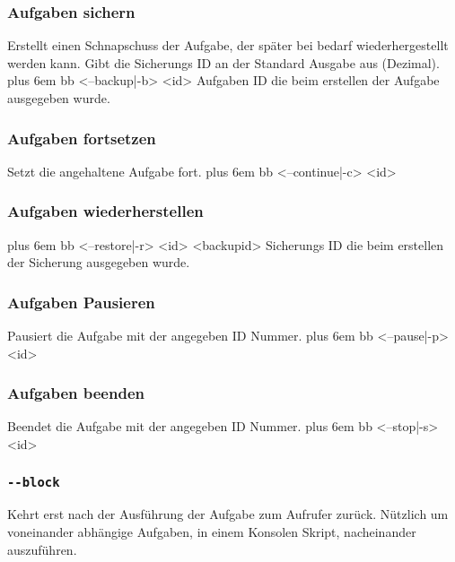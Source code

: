 \documentclass[a4paper,12pt]{article}
\makeatletter
\newenvironment{mycode}
 {\def\@xobeysp{\ }\verbatim\rightskip=0pt plus 6em\relax}
 {\endverbatim}
\makeatother
\begin{document}
\subsubsection{Aufgaben sichern}
Erstellt einen Schnapschuss der Aufgabe, der später bei bedarf wiederhergestellt werden kann.
Gibt die Sicherungs ID an der Standard Ausgabe aus (Dezimal).
\begin{mycode}
bb <--backup|-b> <id>
\end{mycode}
Aufgaben ID die beim erstellen der Aufgabe ausgegeben wurde.

\subsubsection{Aufgaben fortsetzen}
Setzt die angehaltene Aufgabe fort.
\begin{mycode}
bb <--continue|-c> <id>
\end{mycode}
\subsubsection{Aufgaben wiederherstellen}
\begin{mycode}
bb <--restore|-r> <id> <backupid>
\end{mycode}
Sicherungs ID die beim erstellen der Sicherung ausgegeben wurde.

\subsubsection{Aufgaben Pausieren}
Pausiert die Aufgabe mit der angegeben ID Nummer.
\begin{mycode}
bb <--pause|-p> <id>
\end{mycode}

\subsubsection{Aufgaben beenden}
Beendet die Aufgabe mit der angegeben ID Nummer.
\begin{mycode}
bb <--stop|-s> <id>
\end{mycode}

\subsubsection{\texttt{-{}-block}}
Kehrt erst nach der Ausführung der Aufgabe zum Aufrufer zurück. Nützlich um voneinander abhängige Aufgaben, in einem Konsolen Skript, nacheinander auszuführen.
\end{document}
